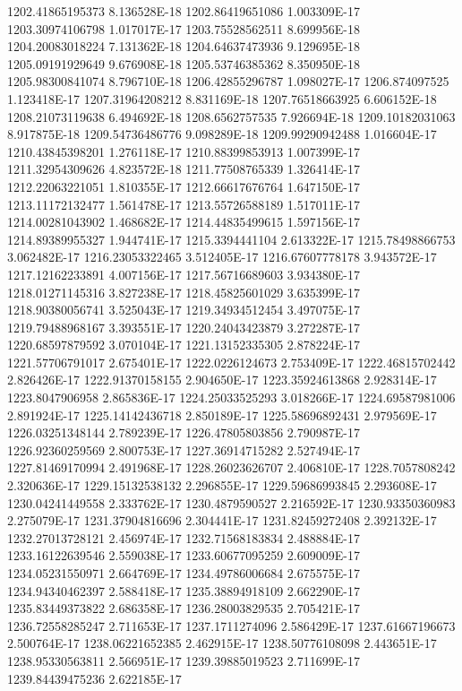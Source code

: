 1202.41865195373  8.136528E-18
1202.86419651086  1.003309E-17
1203.30974106798  1.017017E-17
1203.75528562511  8.699956E-18
1204.20083018224  7.131362E-18
1204.64637473936  9.129695E-18
1205.09191929649  9.676908E-18
1205.53746385362  8.350950E-18
1205.98300841074  8.796710E-18
1206.42855296787  1.098027E-17
1206.874097525  1.123418E-17
1207.31964208212  8.831169E-18
1207.76518663925  6.606152E-18
1208.21073119638  6.494692E-18
1208.6562757535  7.926694E-18
1209.10182031063  8.917875E-18
1209.54736486776  9.098289E-18
1209.99290942488  1.016604E-17
1210.43845398201  1.276118E-17
1210.88399853913  1.007399E-17
1211.32954309626  4.823572E-18
1211.77508765339  1.326414E-17
1212.22063221051  1.810355E-17
1212.66617676764  1.647150E-17
1213.11172132477  1.561478E-17
1213.55726588189  1.517011E-17
1214.00281043902  1.468682E-17
1214.44835499615  1.597156E-17
1214.89389955327  1.944741E-17
1215.3394441104  2.613322E-17
1215.78498866753  3.062482E-17
1216.23053322465  3.512405E-17
1216.67607778178  3.943572E-17
1217.12162233891  4.007156E-17
1217.56716689603  3.934380E-17
1218.01271145316  3.827238E-17
1218.45825601029  3.635399E-17
1218.90380056741  3.525043E-17
1219.34934512454  3.497075E-17
1219.79488968167  3.393551E-17
1220.24043423879  3.272287E-17
1220.68597879592  3.070104E-17
1221.13152335305  2.878224E-17
1221.57706791017  2.675401E-17
1222.0226124673  2.753409E-17
1222.46815702442  2.826426E-17
1222.91370158155  2.904650E-17
1223.35924613868  2.928314E-17
1223.8047906958  2.865836E-17
1224.25033525293  3.018266E-17
1224.69587981006  2.891924E-17
1225.14142436718  2.850189E-17
1225.58696892431  2.979569E-17
1226.03251348144  2.789239E-17
1226.47805803856  2.790987E-17
1226.92360259569  2.800753E-17
1227.36914715282  2.527494E-17
1227.81469170994  2.491968E-17
1228.26023626707  2.406810E-17
1228.7057808242  2.320636E-17
1229.15132538132  2.296855E-17
1229.59686993845  2.293608E-17
1230.04241449558  2.333762E-17
1230.4879590527  2.216592E-17
1230.93350360983  2.275079E-17
1231.37904816696  2.304441E-17
1231.82459272408  2.392132E-17
1232.27013728121  2.456974E-17
1232.71568183834  2.488884E-17
1233.16122639546  2.559038E-17
1233.60677095259  2.609009E-17
1234.05231550971  2.664769E-17
1234.49786006684  2.675575E-17
1234.94340462397  2.588418E-17
1235.38894918109  2.662290E-17
1235.83449373822  2.686358E-17
1236.28003829535  2.705421E-17
1236.72558285247  2.711653E-17
1237.1711274096  2.586429E-17
1237.61667196673  2.500764E-17
1238.06221652385  2.462915E-17
1238.50776108098  2.443651E-17
1238.95330563811  2.566951E-17
1239.39885019523  2.711699E-17
1239.84439475236  2.622185E-17
